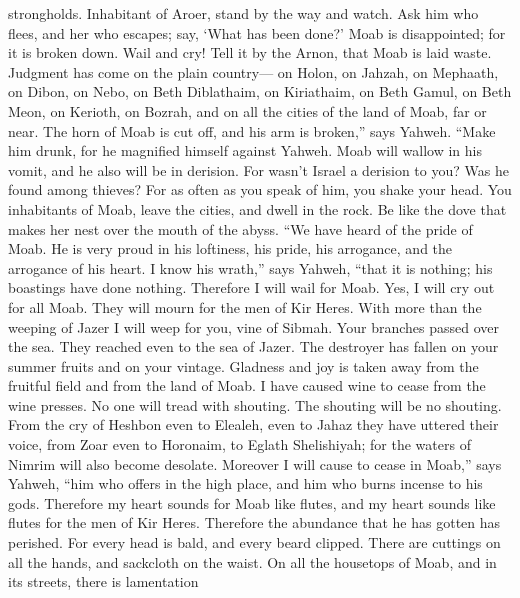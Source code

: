 strongholds.  Inhabitant of Aroer, stand by the way and
watch. Ask him who flees, and her who escapes; say, `What has been
done?'  Moab is disappointed; for it is broken down. Wail
and cry! Tell it by the Arnon, that Moab is laid waste. 
Judgment has come on the plain country--- on Holon, on Jahzah, on
Mephaath,  on Dibon, on Nebo, on Beth Diblathaim,
 on Kiriathaim, on Beth Gamul, on Beth Meon, 
on Kerioth, on Bozrah, and on all the cities of the land of Moab, far or
near.  The horn of Moab is cut off, and his arm is
broken,'' says Yahweh.  ``Make him drunk, for he magnified
himself against Yahweh. Moab will wallow in his vomit, and he also will
be in derision.  For wasn't Israel a derision to you? Was
he found among thieves? For as often as you speak of him, you shake your
head.  You inhabitants of Moab, leave the cities, and dwell
in the rock. Be like the dove that makes her nest over the mouth of the
abyss.  ``We have heard of the pride of Moab. He is very
proud in his loftiness, his pride, his arrogance, and the arrogance of
his heart.  I know his wrath,'' says Yahweh, ``that it is
nothing; his boastings have done nothing.  Therefore I will
wail for Moab. Yes, I will cry out for all Moab. They will mourn for the
men of Kir Heres.  With more than the weeping of Jazer I
will weep for you, vine of Sibmah. Your branches passed over the sea.
They reached even to the sea of Jazer. The destroyer has fallen on your
summer fruits and on your vintage.  Gladness and joy is
taken away from the fruitful field and from the land of Moab. I have
caused wine to cease from the wine presses. No one will tread with
shouting. The shouting will be no shouting.  From the cry
of Heshbon even to Elealeh, even to Jahaz they have uttered their voice,
from Zoar even to Horonaim, to Eglath Shelishiyah; for the waters of
Nimrim will also become desolate.  Moreover I will cause to
cease in Moab,'' says Yahweh, ``him who offers in the high place, and
him who burns incense to his gods.  Therefore my heart
sounds for Moab like flutes, and my heart sounds like flutes for the men
of Kir Heres. Therefore the abundance that he has gotten has perished.
 For every head is bald, and every beard clipped. There are
cuttings on all the hands, and sackcloth on the waist.  On
all the housetops of Moab, and in its streets, there is lamentation
